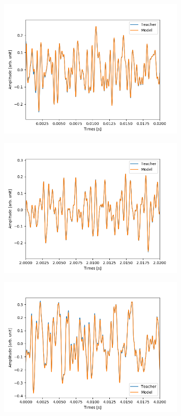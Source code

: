 \documentclass{jreport}		%
\begin{document}
\begin{figure}[htbp]
 \begin{minipage}{0.5\hsize}
 \begin{center}
  \includegraphics[width=90mm]{gain1_output_hikaku.png}
 \end{center}
 \label{fig:one}
 \end{minipage}
 \begin{minipage}{0.5\hsize}
 \begin{center}
  \includegraphics[width=90mm]{gain1_output_hikaku2.png}
 \end{center}
 \label{fig:two}
 \end{minipage}
 \begin{minipage}{0.5\hsize}
 \begin{center}
  \includegraphics[width=90mm]{gain1_output_hikaku3.png}

\end{center}
\end{minipage}
\end{figure}
\end{document}
